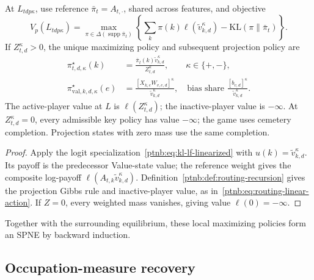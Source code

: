 \begin{proposition}\label{ptnb:prop:attn-value-policy}
At $L_{tdp\kappa}$, use reference $\bar\pi_t=A_{t,\cdot}$, shared across features, and objective
\begin{equation}\label{ptnb:eq:attn-value-routing}
    V_p(L_{tdp\kappa})=
    \max_{\pi\in\Delta(\operatorname{supp}\bar\pi_t)}
      \left\{\sum_k\pi(k)\ell(\tilde v_{k,d}^\kappa)
      -\mathrm{KL}(\pi\|\bar\pi_t)\right\}.
\end{equation}
If $Z_{t,d}^\kappa>0$, the unique maximizing policy and subsequent projection policy are
\begin{align}
    \pi_{t,d,\kappa}^\star(k)
      &=\frac{\bar\pi_t(k)\tilde v_{k,d}^\kappa}{Z_{t,d}^\kappa},
      \qquad \kappa\in\{+,-\},\label{ptnb:eq:attn-value-policy}\\
    \pi_{\mathrm{val},k,d,\kappa}^\star(e)
      &=\frac{[X_{k,e}W_{v,e,d}]^\kappa}{\tilde v_{k,d}^\kappa},
      \quad\text{bias share }\frac{[b_{v,d}]^\kappa}{\tilde v_{k,d}^\kappa}.
      \label{ptnb:eq:attn-V-routing-policy}
\end{align}
The active-player value at $L$ is $\ell(Z_{t,d}^\kappa)$; the inactive-player value is $-\infty$. At $Z_{t,d}^\kappa=0$, every admissible key policy has value $-\infty$; the game uses cemetery completion. Projection states with zero mass use the same completion.
\end{proposition}
\begin{proof}
Apply the logit specialization~\eqref{ptnb:eq:kl-lf-linearized} with $u(k)=\tilde v_{k,d}^\kappa$. Its payoff is the predecessor Value-state value; the reference weight gives the composite log-payoff $\ell(A_{t,k}\tilde v_{k,d}^\kappa)$. Definition~\ref{ptnb:def:routing-recursion} gives the projection Gibbs rule and inactive-player value, as in~\eqref{ptnb:eq:routing-linear-action}. If $Z=0$, every weighted mass vanishes, giving value $\ell(0)=-\infty$.
\end{proof}
Together with the surrounding equilibrium, these local maximizing policies form an SPNE by backward induction.

\subsection{Occupation-measure recovery}\label{ptnb:app:attention-recovery}

